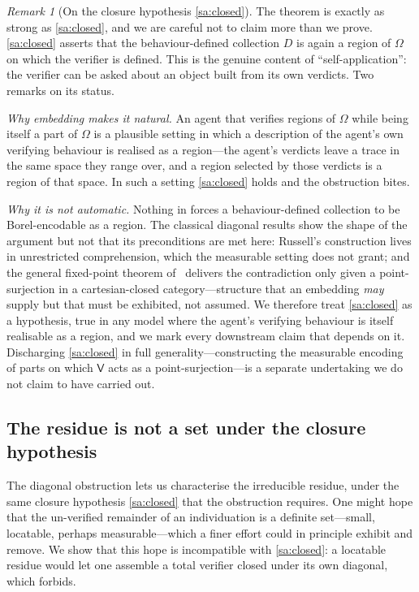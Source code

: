 \documentclass[11pt,twocolumn,a4paper]{article}
\theoremstyle{thmstyle}
\theoremstyle{definition}
\theoremstyle{remark}
\newtheorem{remark}[theorem]{Remark}
\newcommand{\Space}{\Omega}
\newcommand{\Ver}{\mathsf{V}}
\begin{document}
\begin{remark}[On the closure hypothesis \ref{sa:closed}]
\label{rem:self-app}
The theorem is exactly as strong as \ref{sa:closed}, and we are careful not to
claim more than we prove. \ref{sa:closed} asserts that the behaviour-defined
collection $D$ is again a region of $\Space$ on which the verifier is defined.
This is the genuine content of ``self-application'': the verifier can be asked
about an object built from its own verdicts. Two remarks on its status.

\emph{Why embedding makes it natural.} An agent that verifies regions of $\Space$
while being itself a part of $\Space$ is a plausible setting in which a
description of the agent's own verifying behaviour is realised as a region---the
agent's verdicts leave a trace in the same space they range over, and a region
selected by those verdicts is a region of that space. In such a setting
\ref{sa:closed} holds and the obstruction bites.

\emph{Why it is not automatic.} Nothing in  forces a
behaviour-defined collection to be Borel-encodable as a region. The classical
diagonal results show the shape of the argument but not that its preconditions are
met here: Russell's construction lives in unrestricted comprehension, which the
measurable setting does not grant; and the general fixed-point
theorem of~\citet{lawvere1969} delivers the contradiction only given a
point-surjection in a cartesian-closed category---structure that an embedding
\emph{may} supply but that must be exhibited, not assumed. We therefore treat
\ref{sa:closed} as a hypothesis, true in any model where the agent's verifying
behaviour is itself realisable as a region, and we mark every downstream claim
that depends on it. Discharging \ref{sa:closed} in full generality---constructing
the measurable encoding of parts on which $\Ver$ acts as a point-surjection---is a
separate undertaking we do not claim to have carried out.
\end{remark}

\subsection{The residue is not a set under the closure hypothesis}

The diagonal obstruction lets us characterise the irreducible residue, under the
same closure hypothesis \ref{sa:closed} that the obstruction requires. One might
hope that the un-verified remainder of an individuation is a definite set---small,
locatable, perhaps measurable---which a finer effort could in principle exhibit
and remove. We show that this hope is incompatible with \ref{sa:closed}: a
locatable residue would let one assemble a total verifier closed under its own
diagonal, which  forbids.
\end{document}
